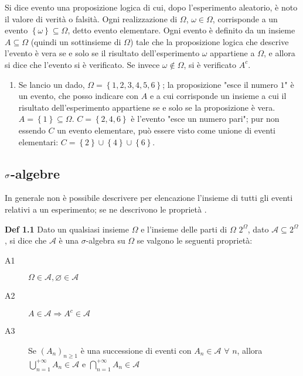 \documentclass{article}
\begin{document}
Si dice evento una proposizione logica di cui, dopo l'esperimento aleatorio, 
\`{e} noto il valore di verit\`{a} o falsit\`{a}. Ogni realizzazione di $%
\Omega $, $\omega \in \Omega $, corrisponde a un evento $\left\{ \omega
\right\} \subseteq \Omega $, detto evento elementare. Ogni evento \`{e}
definito da un insieme $A\subseteq \Omega $ (quindi un sottinsieme di $%
\Omega $) tale che la proposizione logica che descrive l'evento \`{e} vera
se e solo se il risultato dell'esperimento $\omega $ appartiene a $\Omega $,
e allora si dice che l'evento si \`{e} verificato. Se invece $\omega \not\in
\Omega $, si \`{e} verificato $A^{c}$.

\begin{enumerate}
\item Se lancio un dado, $\Omega =\left\{ 1,2,3,4,5,6\right\} $; la
proposizione "esce il numero $1$" \`{e} un evento, che posso indicare con $A$
e a cui corrisponde un insieme a cui il risultato dell'esperimento
appartiene se e solo se la proposizione \`{e} vera. $A=\left\{ 1\right\}
\subseteq \Omega $. $C=\left\{ 2,4,6\right\} $ \`{e} l'evento "esce un
numero pari"; pur non essendo $C$ un evento elementare, pu\`{o} essere visto
come unione di eventi elementari: $C=\left\{ 2\right\} \cup \left\{
4\right\} \cup \left\{ 6\right\} $.
\end{enumerate}

\subsection{$\protect\sigma $-algebre}

In generale non \`{e} possibile descrivere per elencazione l'insieme di
tutti gli eventi relativi a un esperimento; se ne descrivono le propriet\`{a}%
.

\textbf{Def 1.1} Dato un qualsiasi insieme $\Omega $ e l'insieme delle parti
di $\Omega $ $2^{\Omega }$, dato $\mathcal{A}\subseteq 2^{\Omega }$, si dice
che $\mathcal{A}$ \`{e} una $\sigma $-algebra su $\Omega $ se valgono le
seguenti propriet\`{a}:

\begin{description}
\item[A1] $\Omega \in \mathcal{A},\varnothing \in \mathcal{A}$

\item[A2] $A\in \mathcal{A}\Longrightarrow A^{c}\in \mathcal{A}$

\item[A3] Se $\left( A_{n}\right) _{n\geq 1}$ \`{e} una successione di
eventi con $A_{n}\in \mathcal{A}$ $\forall $ $n$, allora $%
\bigcup_{n=1}^{+\infty }A_{n}\in \mathcal{A}$ e $\bigcap_{n=1}^{+\infty
}A_{n}\in \mathcal{A}$
\end{description}
\end{document}
